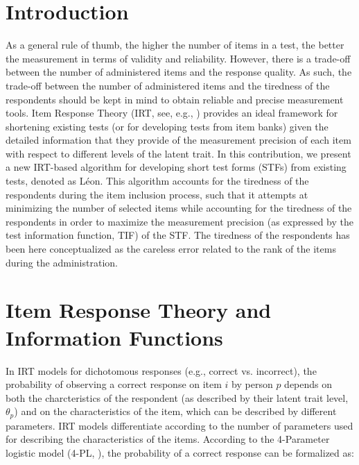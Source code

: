 \documentclass{svproc}
\begin{document}
\section{Introduction}
%
As a general rule of thumb, the higher the number of items in a test, the better the measurement in terms of validity and reliability. However, there is a trade-off between the number of administered items and the response quality. As such, the trade-off between the number of administered items and the tiredness of the respondents should be kept in mind to obtain reliable and precise measurement tools. Item Response Theory (IRT, see, e.g., \cite{baker}) provides an ideal framework for shortening existing tests (or for developing tests from item banks) given the detailed information that they provide of the measurement precision of each item with respect to different levels of the latent trait. 
In this contribution, we present a new IRT-based algorithm for developing short test forms (STFs) from existing tests, denoted as Léon. This algorithm accounts for the tiredness of the respondents during the item inclusion process, such that it attempts at minimizing the number of selected items while accounting for the tiredness  of the respondents in order to maximize the measurement precision (as expressed by the test information function, TIF) of the STF.
\color{red} The tiredness of the respondents has been here conceptualized as the careless error related to the rank of the items during the administration. \normalcolor

\section{Item Response Theory and Information Functions}  

In IRT models for dichotomous responses (e.g., correct vs. incorrect), the probability of observing a correct response on item $i$ by person $p$ depends on both the charcteristics of the respondent (as described by their latent trait level, $\theta_p$) and on the characteristics of the item, which can be described by different parameters. IRT models differentiate according to the number of parameters used for describing the characteristics of the items. According to the 4-Parameter logistic model (4-PL, \cite{barton:4pl}), the probability of a correct response can be formalized as: 
\end{document}
